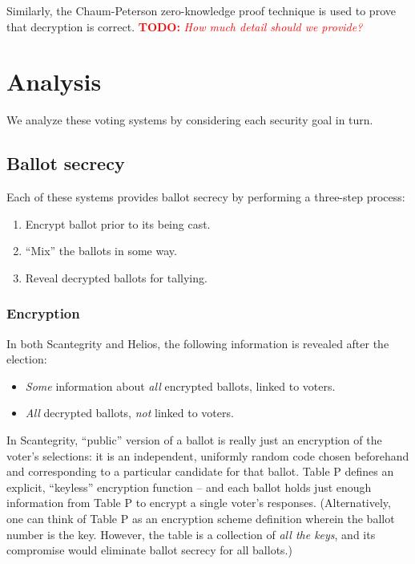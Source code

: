 \documentclass[10pt,twocolumn]{article}
\newcommand{\todo}[1]{\textcolor{red}{\textbf{TODO:} \emph{#1}}}
\begin{document}
Similarly, the Chaum-Peterson zero-knowledge proof technique is used to prove that decryption is
correct. \todo{How much detail should we provide?}

\section{Analysis}

We analyze these voting systems by considering each security goal in turn.

\subsection{Ballot secrecy}

Each of these systems provides ballot secrecy by performing a three-step process:
\begin{enumerate}
	\item
		Encrypt ballot prior to its being cast.
	\item
		``Mix'' the ballots in some way.
	\item
		Reveal decrypted ballots for tallying.
\end{enumerate}

\subsubsection{Encryption}

In both Scantegrity and Helios, the following information is revealed after the election:
\begin{itemize}
	\item
		\emph{Some} information about \emph{all} encrypted ballots, linked to voters.
	\item
		\emph{All} decrypted ballots, \emph{not} linked to voters.
\end{itemize}

In Scantegrity, ``public'' version of a ballot is really just an encryption of the voter's
selections: it is an independent, uniformly random code chosen beforehand and corresponding to a
particular candidate for that ballot. Table P defines an explicit, ``keyless'' encryption
function -- and each ballot holds just enough information from Table P to encrypt a single voter's
responses. (Alternatively, one can think of Table P as an encryption scheme definition wherein the
ballot number is the key. However, the table is a collection of \emph{all the keys}, and its
compromise would eliminate ballot secrecy for all ballots.)
\end{document}
